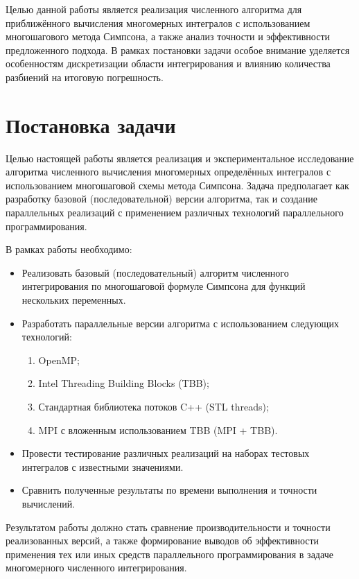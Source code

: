 \documentclass[a4paper,12pt]{article}
\begin{document}
Целью данной работы является реализация численного алгоритма для приближённого вычисления многомерных интегралов с использованием многошагового метода Симпсона, а также анализ точности и эффективности предложенного подхода. В рамках постановки задачи особое внимание уделяется особенностям дискретизации области интегрирования и влиянию количества разбиений на итоговую погрешность.

\section*{Постановка задачи}

Целью настоящей работы является реализация и экспериментальное исследование алгоритма численного вычисления многомерных определённых интегралов с использованием многошаговой схемы метода Симпсона. Задача предполагает как разработку базовой (последовательной) версии алгоритма, так и создание параллельных реализаций с применением различных технологий параллельного программирования.

В рамках работы необходимо:

\begin{itemize}
\item Реализовать базовый (последовательный) алгоритм численного интегрирования по многошаговой формуле Симпсона для функций нескольких переменных.
\item Разработать параллельные версии алгоритма с использованием следующих технологий:
\begin{enumerate}
\item OpenMP;
\item Intel Threading Building Blocks (TBB);
\item Стандартная библиотека потоков C++ (STL threads);
\item MPI с вложенным использованием TBB (MPI + TBB).
\end{enumerate}
\item Провести тестирование различных реализаций на наборах тестовых интегралов с известными значениями.
\item Сравнить полученные результаты по времени выполнения и точности вычислений.
\end{itemize}

Результатом работы должно стать сравнение производительности и точности реализованных версий, а также формирование выводов об эффективности применения тех или иных средств параллельного программирования в задаче многомерного численного интегрирования.
\end{document}
